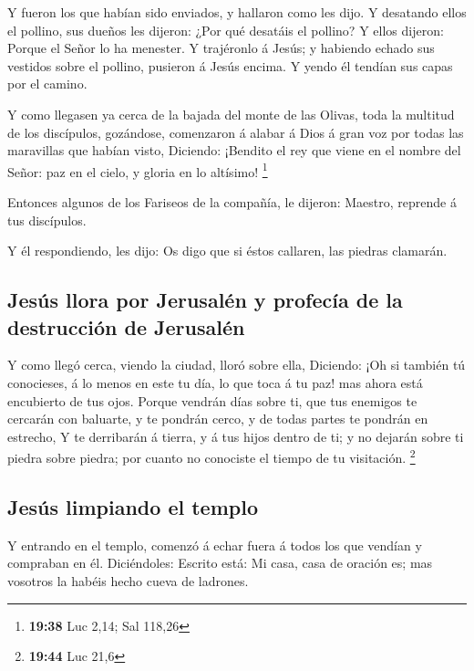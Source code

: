  Y fueron los que habían sido enviados, y hallaron como les
dijo.  Y desatando ellos el pollino, sus dueños les
dijeron: ¿Por qué desatáis el pollino?  Y ellos dijeron:
Porque el Señor lo ha menester.  Y trajéronlo á Jesús; y
habiendo echado sus vestidos sobre el pollino, pusieron á Jesús encima.
 Y yendo él tendían sus capas por el camino.

 Y como llegasen ya cerca de la bajada del monte de las
Olivas, toda la multitud de los discípulos, gozándose, comenzaron á
alabar á Dios á gran voz por todas las maravillas que habían visto,
 Diciendo: ¡Bendito el rey que viene en el nombre del
Señor: paz en el cielo, y gloria en lo altísimo! \footnote{\textbf{19:38}
  Luc 2,14; Sal 118,26}

 Entonces algunos de los Fariseos de la compañía, le
dijeron: Maestro, reprende á tus discípulos.

 Y él respondiendo, les dijo: Os digo que si éstos
callaren, las piedras clamarán.

\hypertarget{jesuxfas-llora-por-jerusaluxe9n-y-profecuxeda-de-la-destrucciuxf3n-de-jerusaluxe9n}{%
\subsection{Jesús llora por Jerusalén y profecía de la destrucción de
Jerusalén}\label{jesuxfas-llora-por-jerusaluxe9n-y-profecuxeda-de-la-destrucciuxf3n-de-jerusaluxe9n}}

 Y como llegó cerca, viendo la ciudad, lloró sobre ella,
 Diciendo: ¡Oh si también tú conocieses, á lo menos en este
tu día, lo que toca á tu paz! mas ahora está encubierto de tus ojos.
 Porque vendrán días sobre ti, que tus enemigos te cercarán
con baluarte, y te pondrán cerco, y de todas partes te pondrán en
estrecho,  Y te derribarán á tierra, y á tus hijos dentro
de ti; y no dejarán sobre ti piedra sobre piedra; por cuanto no
conociste el tiempo de tu visitación. \footnote{\textbf{19:44} Luc 21,6}

\hypertarget{jesuxfas-limpiando-el-templo}{%
\subsection{Jesús limpiando el
templo}\label{jesuxfas-limpiando-el-templo}}

 Y entrando en el templo, comenzó á echar fuera á todos los
que vendían y compraban en él.  Diciéndoles: Escrito está:
Mi casa, casa de oración es; mas vosotros la habéis hecho cueva de
ladrones.

